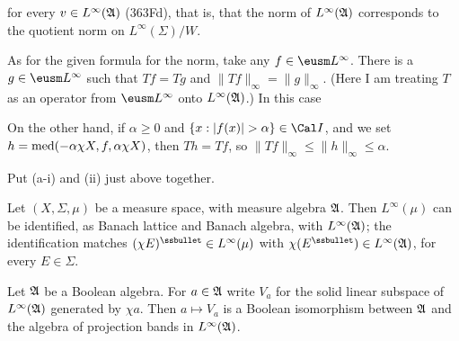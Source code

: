 {\noindent for every $v\in L^{\infty}(\frak A)$ (363Fd), that is, that
the norm of $L^{\infty}(\frak A)$ corresponds to the quotient norm on
$L^{\infty}(\Sigma)/W$.

As for
the given formula for the norm, take any $f\in\eusm L^{\infty}$.   There
is a $g\in \eusm L^{\infty}$ such that
$Tf=Tg$ and $\|Tf\|_{\infty}
=\|g\|_{\infty}$.   (Here I am treating $T$ as an operator from
$\eusm L^{\infty}$ onto $L^{\infty}(\frak A)$.)   In this case


\noindent On the other hand, if $\alpha\ge 0$ and
$\{x:|f(x)|>\alpha\}\in\Cal I$, and we
set $h=\mathop{\text{med}}(-\alpha\chi X,f,\alpha\chi X)$, then
$Th=Tf$, so $\|Tf\|_{\infty}\le\|h\|_{\infty}\le\alpha$.

\medskip

 Put (a-i) and (ii) just above together.
}%

 Let $(X,\Sigma,\mu)$ be a measure space, with
measure algebra $\frak A$.   Then $L^{\infty}(\mu)$ can be identified,
as Banach lattice and Banach algebra, with $L^{\infty}(\frak A)$;  the
identification matches $(\chi E)^{\ssbullet}\in L^{\infty}(\mu)$ with
$\chi(E^{\ssbullet})\in L^{\infty}(\frak A)$, for every $E\in\Sigma$.


  Let
$\frak A$ be a Boolean algebra.   For $a\in\frak A$ write $V_a$ for the
solid linear subspace of $L^{\infty}(\frak A)$ generated by $\chi a$.
Then $a\mapsto V_a$ is a Boolean isomorphism between $\frak A$ and the
algebra of projection bands in $L^{\infty}(\frak A)$.


